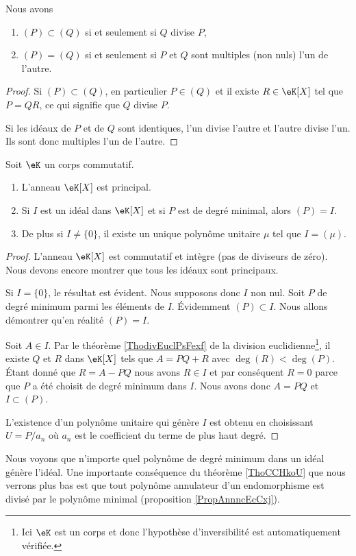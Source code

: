 \begin{lemma}
    Nous avons
    \begin{enumerate}
        \item
            \( (P)\subset (Q)\) si et seulement si \( Q\) divise \( P\),
        \item
            \( (P)=(Q)\) si et seulement si \( P\) et \( Q\) sont multiples (non nuls) l'un de l'autre.
    \end{enumerate}
\end{lemma}

\begin{proof}
    Si \( (P)\subset (Q)\), en particulier \( P\in(Q)\) et il existe \( R\in\eK[X]\) tel que \( P=QR\), ce qui signifie que \( Q\) divise \( P\).

    Si les idéaux de \( P\) et de \( Q\) sont identiques, l'un divise l'autre et l'autre divise l'un. Ils sont donc multiples l'un de l'autre.
\end{proof}

\begin{theorem}     \label{ThoCCHkoU}
    Soit \( \eK\) un corps commutatif.
    \begin{enumerate}
        \item
            L'anneau \( \eK[X]\) est principal. 
        \item
            Si \( I\) est un idéal dans \( \eK[X]\) et si \( P\) est de degré minimal, alors \( (P)=I\).
        \item
            De plus si \( I\neq \{  0\}\), il existe un unique polynôme unitaire \( \mu\) tel que \( I=(\mu)\).
    \end{enumerate}
\end{theorem}

\begin{proof}
    L'anneau \( \eK[X]\) est commutatif et intègre (pas de diviseurs de zéro). Nous devons encore montrer que tous les idéaux sont principaux.

    Si \( I=\{ 0 \}\), le résultat est évident. Nous supposons donc \( I\) non nul. Soit \( P\) de degré minimum parmi les éléments de \( I\). Évidemment \( (P)\subset I\). Nous allons démontrer qu'en réalité \( (P)=I\).

    Soit \( A\in I\). Par le théorème \ref{ThodivEuclPsFexf} de la division euclidienne\footnote{Ici \( \eK\) est un corps et donc l'hypothèse d'inversibilité est automatiquement vérifiée.}, il existe \( Q\) et \( R\) dans \( \eK[X]\) tels que \( A=PQ+R\) avec \( \deg(R)<\deg(P)\). Étant donné que \( R=A-PQ\) nous avons \( R\in I\) et par conséquent \( R=0\) parce que \( P\) a été choisit de degré minimum dans \( I\). Nous avons donc \( A=PQ\) et \( I\subset (P)\).

    L'existence d'un polynôme unitaire qui génère \( I\) est obtenu en choisissant \( U=P/a_n\) où \( a_n\) est le coefficient du terme de plus haut degré.
\end{proof}
Nous voyons que n'importe quel polynôme de degré minimum dans un idéal génère l'idéal. Une importante conséquence du théorème \ref{ThoCCHkoU} que nous verrons plus bas est que tout polynôme annulateur d'un endomorphisme est divisé par le polynôme minimal (proposition \ref{PropAnnncEcCxj}).

